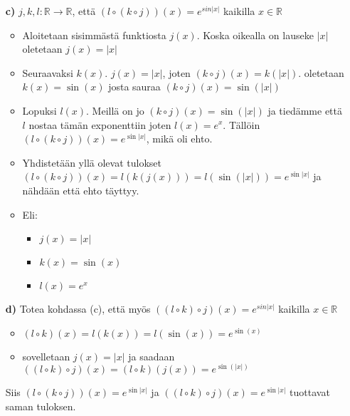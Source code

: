 \documentclass{article}
\begin{document}
\begin{itemize}
        \item[\textbf{c)}] $j, k, l : \mathbb{R} \rightarrow \mathbb{R}$, että $(l \circ (k \circ j))(x) = e^{sin |x|}$ kaikilla $x \in \mathbb{R}$
        \begin{itemize}
            \item Aloitetaan sisimmästä funktiosta $j(x)$. Koska oikealla on lauseke $|x|$ oletetaan $j(x) = |x|$
            \item Seuraavaksi $k(x)$. $j(x) = |x|$, joten $(k \circ j)(x) = k(|x|)$. oletetaan $k(x) = \sin(x)$ josta sauraa $(k \circ j)(x) = \sin(|x|)$
            \item Lopuksi $l(x)$. Meillä on jo $(k \circ j)(x) = \sin(|x|)$ ja tiedämme että $l$ nostaa tämän exponenttiin joten $l(x) = e^x$. Tällöin $(l \circ (k \circ j))(x) = e^{\sin |x|}$, mikä oli ehto.
            \item Yhdistetään yllä olevat tulokset $(l \circ (k \circ j))(x) = l(k(j(x))) = l(\sin(|x|)) = e^{\sin |x|}$ ja nähdään että ehto täyttyy.
            \item Eli:
            \begin{itemize}
                \item $j(x) = |x|$
                \item $k(x) = \sin(x)$
                \item $l(x) = e^x$
            \end{itemize}
        \end{itemize}
\pagebreak
        \item[\textbf{d)}] Totea kohdassa (c), että myös $((l \circ k) \circ j)(x) = e^{sin |x|}$ kaikilla $x \in \mathbb{R}$
        \begin{itemize}
            \item $(l \circ k)(x) = l(k(x)) = l(\sin(x)) = e^{\sin(x)}$
            \item sovelletaan $j(x) = |x|$ ja saadaan $((l \circ k) \circ j)(x) = (l \circ k)(j(x)) = e^{\sin(|x|)}$
        \end{itemize}
        Siis $(l \circ (k \circ j))(x) = e^{\sin |x|}$ ja $((l \circ k) \circ j)(x) = e^{\sin |x|}$ tuottavat saman tuloksen.
\end{itemize}
\end{document}
